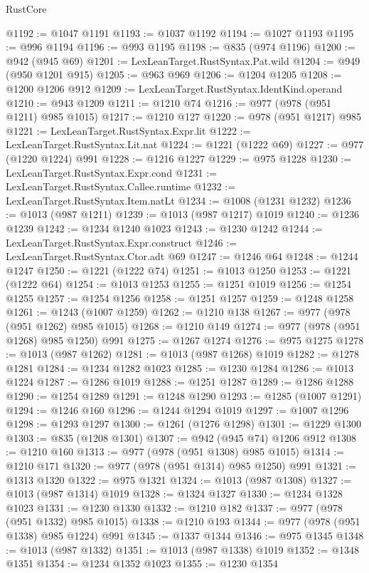 \begin{lexlean}{RustCore}
\begin{coremodule}
@1192 := @1047 @1191
@1193 := @1037 @1192
@1194 := @1027 @1193
@1195 := @996 @1194
@1196 := @993 @1195
@1198 := @835 (@974 @1196)
@1200 := @942 (@945 @69)
@1201 := LexLeanTarget.RustSyntax.Pat.wild
@1204 := @949 (@950 @1201 @915)
@1205 := @963 @969
@1206 := @1204 @1205
@1208 := @1200 @1206 @912
@1209 := LexLeanTarget.RustSyntax.IdentKind.operand
@1210 := @943 @1209
@1211 := @1210 @74
@1216 := @977 (@978 (@951 @1211) @985 @1015)
@1217 := @1210 @127
@1220 := @978 (@951 @1217) @985
@1221 := LexLeanTarget.RustSyntax.Expr.lit
@1222 := LexLeanTarget.RustSyntax.Lit.nat
@1224 := @1221 (@1222 @69)
@1227 := @977 (@1220 @1224) @991
@1228 := @1216 @1227
@1229 := @975 @1228
@1230 := LexLeanTarget.RustSyntax.Expr.cond
@1231 := LexLeanTarget.RustSyntax.Callee.runtime
@1232 := LexLeanTarget.RustSyntax.Item.natLt
@1234 := @1008 (@1231 @1232)
@1236 := @1013 (@987 @1211)
@1239 := @1013 (@987 @1217) @1019
@1240 := @1236 @1239
@1242 := @1234 @1240 @1023
@1243 := @1230 @1242
@1244 := LexLeanTarget.RustSyntax.Expr.construct
@1246 := LexLeanTarget.RustSyntax.Ctor.adt @69
@1247 := @1246 @64
@1248 := @1244 @1247
@1250 := @1221 (@1222 @74)
@1251 := @1013 @1250
@1253 := @1221 (@1222 @64)
@1254 := @1013 @1253
@1255 := @1251 @1019
@1256 := @1254 @1255
@1257 := @1254 @1256
@1258 := @1251 @1257
@1259 := @1248 @1258
@1261 := @1243 (@1007 @1259)
@1262 := @1210 @138
@1267 := @977 (@978 (@951 @1262) @985 @1015)
@1268 := @1210 @149
@1274 := @977 (@978 (@951 @1268) @985 @1250) @991
@1275 := @1267 @1274
@1276 := @975 @1275
@1278 := @1013 (@987 @1262)
@1281 := @1013 (@987 @1268) @1019
@1282 := @1278 @1281
@1284 := @1234 @1282 @1023
@1285 := @1230 @1284
@1286 := @1013 @1224
@1287 := @1286 @1019
@1288 := @1251 @1287
@1289 := @1286 @1288
@1290 := @1254 @1289
@1291 := @1248 @1290
@1293 := @1285 (@1007 @1291)
@1294 := @1246 @160
@1296 := @1244 @1294 @1019
@1297 := @1007 @1296
@1298 := @1293 @1297
@1300 := @1261 (@1276 @1298)
@1301 := @1229 @1300
@1303 := @835 (@1208 @1301)
@1307 := @942 (@945 @74) @1206 @912
@1308 := @1210 @160
@1313 := @977 (@978 (@951 @1308) @985 @1015)
@1314 := @1210 @171
@1320 := @977 (@978 (@951 @1314) @985 @1250) @991
@1321 := @1313 @1320
@1322 := @975 @1321
@1324 := @1013 (@987 @1308)
@1327 := @1013 (@987 @1314) @1019
@1328 := @1324 @1327
@1330 := @1234 @1328 @1023
@1331 := @1230 @1330
@1332 := @1210 @182
@1337 := @977 (@978 (@951 @1332) @985 @1015)
@1338 := @1210 @193
@1344 := @977 (@978 (@951 @1338) @985 @1224) @991
@1345 := @1337 @1344
@1346 := @975 @1345
@1348 := @1013 (@987 @1332)
@1351 := @1013 (@987 @1338) @1019
@1352 := @1348 @1351
@1354 := @1234 @1352 @1023
@1355 := @1230 @1354

\end{coremodule}
\end{lexlean}

